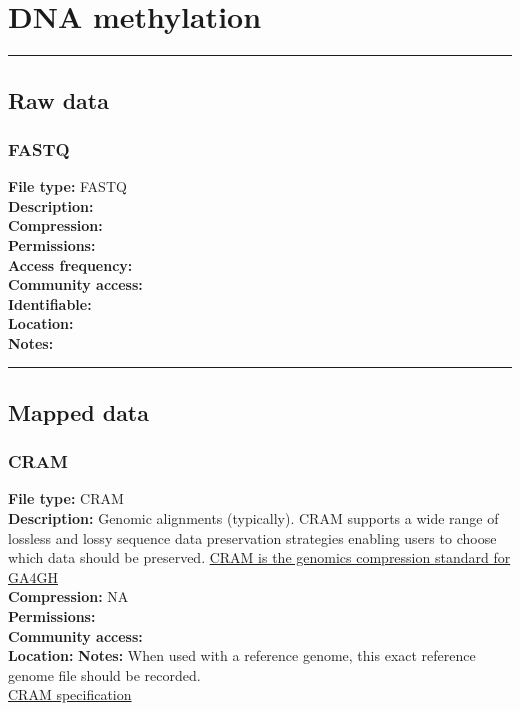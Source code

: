 \documentclass[
]{book}
\begin{document}
\hypertarget{dna-methylation}{%
\chapter{DNA methylation}\label{dna-methylation}}

\begin{center}\rule{0.5\linewidth}{0.5pt}\end{center}

\hypertarget{raw-data}{%
\section{Raw data}\label{raw-data}}

\hypertarget{fastq}{%
\subsection{FASTQ}\label{fastq}}

\textbf{File type:} FASTQ\\
\textbf{Description:}\\
\textbf{Compression:}\\
\textbf{Permissions:}\\
\textbf{Access frequency:}\\
\textbf{Community access:}\\
\textbf{Identifiable:}\\
\textbf{Location:}\\
\textbf{Notes:}

\begin{center}\rule{0.5\linewidth}{0.5pt}\end{center}

\hypertarget{mapped-data}{%
\section{Mapped data}\label{mapped-data}}

\hypertarget{cram-1}{%
\subsection{CRAM}\label{cram-1}}

\textbf{File type:} CRAM\\
\textbf{Description:} Genomic alignments (typically). CRAM supports a wide
range of lossless and lossy sequence data preservation strategies enabling users to choose which data should be preserved. \href{https://www.ga4gh.org/cram/}{CRAM is the genomics compression standard for GA4GH}\\
\textbf{Compression:} NA\\
\textbf{Permissions:}\\
\textbf{Community access:}\\
\textbf{Location:}
\textbf{Notes:} When used with a reference genome, this exact reference genome file should be recorded.\\
\href{https://samtools.github.io/hts-specs/CRAMv3.pdf}{CRAM specification}
\end{document}
